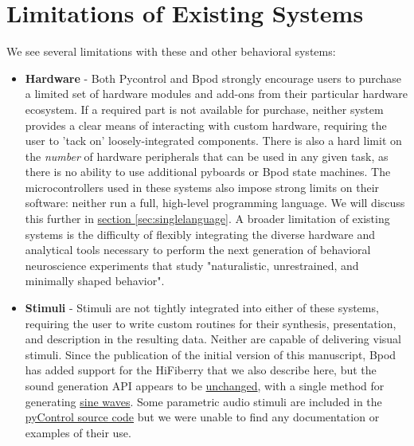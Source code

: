 
\section{Limitations of Existing Systems}
\label{sec:limitations}

We see several limitations with these and other behavioral systems:

\begin{itemize}[after=\vspace{-\topsep}]
    \item \textbf{Hardware} - Both Pycontrol and Bpod strongly encourage users to purchase a limited set of hardware modules and add-ons from their particular hardware ecosystem. If a required part is not available for purchase, neither system provides a clear means of interacting with custom hardware, requiring the user to 'tack on' loosely-integrated components. There is also a hard limit on the \textit{number} of hardware peripherals that can be used in any given task, as there is no ability to use additional pyboards or Bpod state machines. The microcontrollers used in these systems also impose strong limits on their software: neither run a full, high-level programming language. We will discuss this further in \hyperref[sec:singlelanguage]{section \ref*{sec:singlelanguage}}. A broader  limitation of existing systems is the difficulty of flexibly integrating the diverse hardware and analytical tools necessary to perform the next generation of behavioral neuroscience experiments that study "naturalistic, unrestrained, and minimally shaped behavior"\citep{dattaComputationalNeuroethologyCall2019}.
    \item \textbf{Stimuli} - Stimuli are not tightly integrated into either of these systems, requiring the user to write custom routines for their synthesis, presentation, and description in the resulting data. Neither are capable of delivering visual stimuli. Since the publication of the initial version of this manuscript, Bpod has added support for the HiFiberry that we also describe here\citep{sanworksllc.ReasonsUseBpod2021}, but the sound generation API appears to be \href{https://github.com/sanworks/Bpod_Gen2/blob/df6cd0c7d5df8247b02077b05fc263f79b86b096/Examples/Protocols/Sound/HiFiSound2AFC_TrialManager/HiFiSound2AFC_TrialManager.m}{unchanged}, with a single method for generating \href{https://github.com/sanworks/Bpod_Gen2/blob/1cb181dffbb7394acd18819f1d268fd9dec6ec5b/Functions/Internal%20Functions/GenerateSineWave.m}{sine waves}. Some parametric audio stimuli are included in the \href{https://bitbucket.org/takam/pycontrol/src/default/pyControl/audio.py}{pyControl source code} but we were unable to find any documentation or examples of their use. %
\end{itemize}\nobreak%
